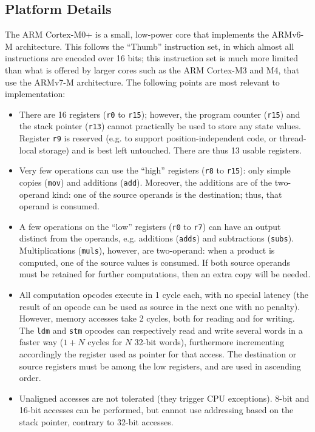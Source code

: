 \documentclass{llncs}
\begin{document}
\subsection{Platform Details}\label{sec:field-ops-platform}

The ARM Cortex-M0+ is a small, low-power core that implements the
ARMv6-M architecture. This follows the ``Thumb'' instruction set, in
which almost all instructions are encoded over 16 bits; this instruction
set is much more limited than what is offered by larger cores such as
the ARM Cortex-M3 and M4, that use the ARMv7-M architecture. The
following points are most relevant to implementation:
\begin{itemize}

    \item There are 16 registers (\verb+r0+ to \verb+r15+); however, the
    program counter (\verb+r15+) and the stack pointer (\verb+r13+)
    cannot practically be used to store any state values. Register
    \verb+r9+ is reserved (e.g. to support position-independent code, or
    thread-local storage) and is best left untouched. There are thus 13
    usable registers.

    \item Very few operations can use the ``high'' registers (\verb+r8+
    to \verb+r15+): only simple copies (\verb+mov+) and additions
    (\verb+add+). Moreover, the additions are of the two-operand kind:
    one of the source operands is the destination; thus, that operand
    is consumed.

    \item A few operations on the ``low'' registers (\verb+r0+ to
    \verb+r7+) can have an output distinct from the operands, e.g.
    additions (\verb+adds+) and subtractions (\verb+subs+).
    Multiplications (\verb+muls+), however, are two-operand: when a
    product is computed, one of the source values is consumed. If both
    source operands must be retained for further computations, then an
    extra copy will be needed.

    \item All computation opcodes execute in 1 cycle each, with no
    special latency (the result of an opcode can be used as source in
    the next one with no penalty). However, memory accesses take 2
    cycles, both for reading and for writing. The \verb+ldm+ and
    \verb+stm+ opcodes can respectively read and write several words
    in a faster way ($1+N$ cycles for $N$ 32-bit words), furthermore
    incrementing accordingly the register used as pointer for that
    access. The destination or source registers must be among the
    low registers, and are used in ascending order.

    \item Unaligned accesses are not tolerated (they trigger CPU
    exceptions). 8-bit and 16-bit accesses can be performed, but cannot
    use addressing based on the stack pointer, contrary to 32-bit
    accesses.

\end{itemize}
\end{document}
